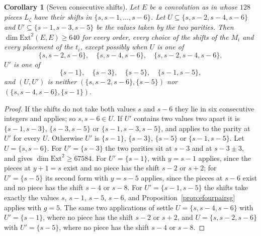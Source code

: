 \documentclass[11pt,reqno]{amsart}
\numberwithin{equation}{section}
\theoremstyle{plain}
\newtheorem{corollary}[theorem]{Corollary}
\theoremstyle{definition}
\newcommand{\Ext}{\mathrm{Ext}}
\begin{document}
\begin{corollary}[Seven consecutive shifts]\label{cor:efourseven}
Let $E$ be a convolution as in \cite[Lemma~18.36]{BMB26} whose $128$ pieces $L_{\zeta}$ have their shifts in $\{s,s-1,\dots,s-6\}$. Let $U\subseteq\{s,s-2,s-4,s-6\}$ and $U'\subseteq\{s-1,s-3,s-5\}$ be the values taken by the two parities. Then $\dim\Ext^{2}(E,E)\ge640$ for every order, every choice of the shifts of the $M_{i}$ and every placement of the $t_{i}$, except possibly when $U$ is one of
\[
\{s,s-2,s-6\},\quad\{s,s-4,s-6\},\quad\{s,s-2,s-4,s-6\},
\]
$U'$ is one of
\[
\{s-1\},\quad\{s-3\},\quad\{s-5\},\quad\{s-1,s-5\},
\]
and $(U,U')$ is neither $(\{s,s-2,s-6\},\{s-5\})$ nor $(\{s,s-4,s-6\},\{s-1\})$.
\end{corollary}

\begin{proof}
If the shifts do not take both values $s$ and $s-6$ they lie in six consecutive integers and \cite[Cor.~18.48]{BMB26} applies; so $s,s-6\in U$. If $U'$ contains two values two apart it is $\{s-1,s-3\}$, $\{s-3,s-5\}$ or $\{s-1,s-3,s-5\}$, and \cite[Thm.~18.41]{BMB26} applies to the parity at $U'$ for every $U$. Otherwise $U'$ is $\{s-1\}$, $\{s-3\}$, $\{s-5\}$ or $\{s-1,s-5\}$. Let $U=\{s,s-6\}$. For $U'=\{s-3\}$ the two parities sit at $s-3$ and at $s-3\pm3$, and \cite[Thm.~18.42]{BMB26} gives $\dim\Ext^{2}\ge67584$. For $U'=\{s-1\}$, \cite[Prop.~18.43]{BMB26} with $y=s-1$ applies, since the pieces at $y+1=s$ exist and no piece has the shift $s-2$ or $s+2$; for $U'=\{s-5\}$ its second form with $y=s-5$ applies, since the pieces at $s-6$ exist and no piece has the shift $s-4$ or $s-8$. For $U'=\{s-1,s-5\}$ the shifts take exactly the values $s$, $s-1$, $s-5$, $s-6$, and Proposition~\ref{prop:efourpairsg} applies with $g=5$. The same two applications of \cite[Prop.~18.43]{BMB26} settle $U=\{s,s-4,s-6\}$ with $U'=\{s-1\}$, where no piece has the shift $s-2$ or $s+2$, and $U=\{s,s-2,s-6\}$ with $U'=\{s-5\}$, where no piece has the shift $s-4$ or $s-8$.
\end{proof}
\end{document}
